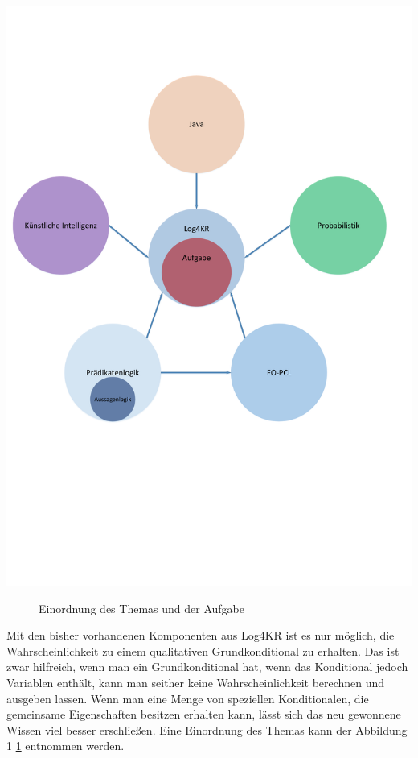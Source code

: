 \documentclass[a4paper, 11pt]{book}
\begin{document}
\includegraphics[scale = 0.3]{Graphics/Eingangsbild}
\begin{figure}[h]
	\caption{Einordnung des Themas und der Aufgabe}
	\label{Eingangsgrafik}
\end{figure}
\newpage

Mit den bisher vorhandenen Komponenten aus Log4KR ist es nur möglich, die Wahrscheinlichkeit zu einem qualitativen Grundkonditional zu erhalten. Das ist zwar hilfreich, wenn man ein Grundkonditional hat, wenn das Konditional jedoch Variablen enthält, kann man seither keine Wahrscheinlichkeit berechnen und ausgeben lassen.
Wenn man eine Menge von speziellen Konditionalen, die gemeinsame Eigenschaften besitzen erhalten kann, lässt sich das neu gewonnene Wissen viel besser erschließen. Eine Einordnung des Themas kann der Abbildung 1 \ref{Eingangsgrafik} entnommen werden.
\end{document}
